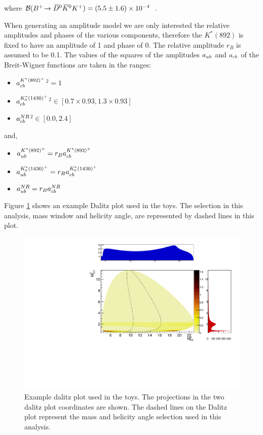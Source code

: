 where ${\mathcal{B}}({{{B}^+}}\!\rightarrow {\ensuremath{{\kern 0.2em\overline{\kern -0.2em D}{}}{}^0}}{\ensuremath{{\kern 0.2em\overline{\kern -0.2em K}{}}{}^0}}{\ensuremath{{K}^+}}) = (5.5 \pm 1.6) \times 10^{-4}$~\cite{PDG2014}.

When generating an amplitude model we are only interested the relative amplitudes and phases of the various components, therefore the $K^*(892)$ is fixed to have an amplitude of 1 and phase of 0. The relative amplitude $r_B$ is assumed to be 0.1. The values of the squares of the amplitudes $a_{{u}{b}}$ and $a_{{c}{b}}$ of the Breit-Wigner functions are taken in the ranges:

\begin{itemize}
\item \textbar $a_{{c}{b}}^{K^*(892)^+}$\textbar$^2 = 1$
\item \textbar $a_{{c}{b}}^{K^*_0(1430)^+}$\textbar$^2 \in [0.7 \times 0.93,1.3 \times 0.93]$
\item \textbar $a_{{c}{b}}^{NR}$\textbar$^2 \in [0.0,2.4]$
\end{itemize}

and,

\begin{itemize}
\item $a_{{u}{b}}^{K^*(892)^+} = r_B a_{{c}{b}}^{K^*(892)^+}$
\item $a_{{u}{b}}^{K^*_0(1430)^+} = r_B a_{{c}{b}}^{K^*_0(1430)^+}$
\item $a_{{u}{b}}^{NR} = r_B a_{{c}{b}}^{NR}$
\end{itemize}

Figure \ref{dalitzplot} shows an example Dalitz plot used in the toys. The \Kstar selection in this analysis, \Kstar mass window and \KS helicity angle, are represented by dashed lines in this plot.

\begin{figure}[h]
\centering
\includegraphics[width=0.8\linewidth]{figures/results/dalitz.pdf}
\caption{Example dalitz plot used in the toys. The projections in the two dalitz plot coordinates are shown. The dashed lines on the Dalitz plot represent the \Kstar mass and \KS helicity angle selection used in this analysis.}
\label{dalitzplot}
\end{figure}

